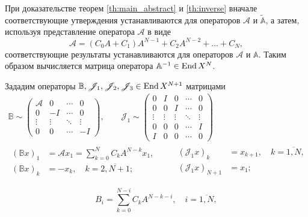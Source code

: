При доказательстве теорем \ref{th:main_abstract} и \ref{th:inverse} вначале соответствующие утверждения устанавливаются для операторов $\mathcal A$ и $\widetilde{\mathbb A}$, а затем, используя представление оператора $\mathcal A$ в виде
\[\mathcal A = (C_0 A + C_1) A^{N-1} + C_2 A^{N-2} + \dotsc + C_N, \]
соответствующие результаты устанавливаются для операторов $\mathcal A$ и $\mathbb A$. Таким образом вычисляется матрица оператора $\mathbb A^{-1} \in \operatorname{End}{X^N}$.

Зададим операторы $\mathbb B, \mathcal J_1, \mathcal J_2, \mathcal J_3 \in \operatorname{End} X^{N+1}$ матрицами
\begin{gather*}
    \mathbb B \sim \begin{pmatrix}
     \mathcal A & 0 & \cdots &  0 \\
    0 & -I  & \cdots &  0 \\
    \vdots & \vdots & \ddots &  \vdots \\
    0 & 0 & \cdots &  -I
   \end{pmatrix}, \quad\quad \mathcal J_1 \sim \begin{pmatrix}
    0 & I & 0 & \cdots &  0 \\
    0 & 0 & I & \cdots &  0 \\
    \vdots & \vdots & \vdots &  \ddots & \vdots\\
    0 & 0 & 0 & \cdots & I \\
    I & 0 & 0 & \cdots & 0
   \end{pmatrix} \\
    \begin{aligned}
        (\mathbb B x)_1 &= \mathcal A x_1 = \sum_{k = 0}^{N} C_k A^{N - k} x_1, \\
        (\mathbb B x)_k &= -x_k, \quad k = \overline{2,N+1};
    \end{aligned}
    \quad\quad
    \begin{aligned}
        (\mathcal J_1 x)_k &= x_{k + 1}, \quad k = \overline{1,N}, \\
        (\mathcal J_1 x)_{N+1} &= x_1;
    \end{aligned}
\end{gather*}

\[ B_i = \sum_{k=0}^{N-i} C_k A^{N-k-i}, \quad i = \overline{1,N}, \]

